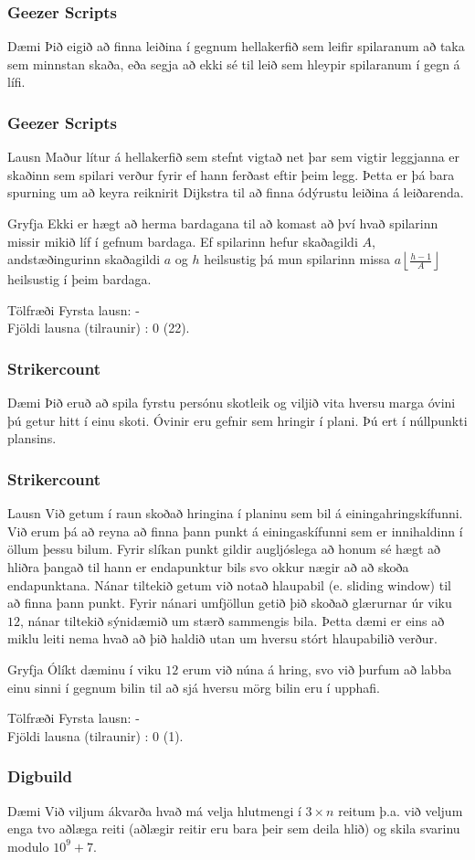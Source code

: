 \documentclass{beamer}
\newcommand\floor[1]{\left\lfloor#1\right\rfloor}
\newcommand\env[2]
{
	\begin{#1}
	#2
	\end{#1}
}
\begin{document}
\env{frame}
{
	\frametitle{Geezer Scripts}
	\small
	\env{block}
	{
		{Dæmi}
		Þið eigið að finna leiðina í gegnum hellakerfið sem leifir spilaranum að taka sem
		minnstan skaða, eða segja að ekki sé til leið sem hleypir spilaranum í gegn á lífi.
	}
}

\env{frame}
{
	\frametitle{Geezer Scripts}
	\small
	\env{block}
	{
		{Lausn}
		Maður lítur á hellakerfið sem stefnt vigtað net þar sem vigtir leggjanna er skaðinn
		sem spilari verður fyrir ef hann ferðast eftir þeim legg. Þetta er þá bara spurning 
		um að keyra reiknirit Dijkstra til að finna ódýrustu leiðina á leiðarenda.
	}
	\pause
	\env{block}
	{
		{Gryfja}
		Ekki er hægt að herma bardagana til að komast að því hvað spilarinn missir mikið líf
		í gefnum bardaga. Ef spilarinn hefur skaðagildi $A$, andstæðingurinn skaðagildi $a$ og
		$h$ heilsustig þá mun spilarinn missa $a \floor{\frac{h - 1}{A}}$ heilsustig í þeim bardaga.
	}
	\pause
	\env{block}
	{
		{Tölfræði}
		Fyrsta lausn: -\\
		Fjöldi lausna (tilraunir) : 0 (22).
	}
}

\env{frame}
{
	\frametitle{Strikercount}
	\small
	\env{block}
	{
		{Dæmi}
		Þið eruð að spila fyrstu persónu skotleik og viljið vita hversu marga óvini þú getur hitt
		í einu skoti. Óvinir eru gefnir sem hringir í plani. Þú ert í núllpunkti plansins.
	}
}

\env{frame}
{
	\frametitle{Strikercount}
	\small
	\env{block}
	{
		{Lausn}
		Við getum í raun skoðað hringina í planinu sem bil á einingahringskífunni. Við erum þá að reyna að finna þann
		punkt á einingaskífunni sem er innihaldinn í öllum þessu bilum. Fyrir slíkan punkt gildir augljóslega að honum sé
		hægt að hliðra þangað til hann er endapunktur bils svo okkur nægir að að skoða endapunktana. Nánar tiltekið
		getum við notað hlaupabil (e. sliding window) til að finna þann punkt. Fyrir nánari umfjöllun getið þið
		skoðað glærurnar úr viku $12$, nánar tiltekið sýnidæmið um stærð sammengis bila. Þetta dæmi er eins að miklu leiti
		nema hvað að þið haldið utan um hversu stórt hlaupabilið verður.
	}
	\pause
	\env{block}
	{
		{Gryfja}
		Ólíkt dæminu í viku $12$ erum við núna á hring, svo við þurfum að labba einu sinni í gegnum bilin til að sjá
		hversu mörg bilin eru í upphafi.
	}
	\pause
	\env{block}
	{
		{Tölfræði}
		Fyrsta lausn: -\\
		Fjöldi lausna (tilraunir) : 0 (1).
	}
}

\env{frame}
{
	\frametitle{Digbuild}
	\small
	\env{block}
	{
		{Dæmi}
		Við viljum ákvarða hvað má velja hlutmengi í $3 \times n$ reitum þ.a. við veljum enga tvo aðlæga reiti
		(aðlægir reitir eru bara þeir sem deila hlið) og skila svarinu modulo $10^9 + 7$.
	}
}
\end{document}
